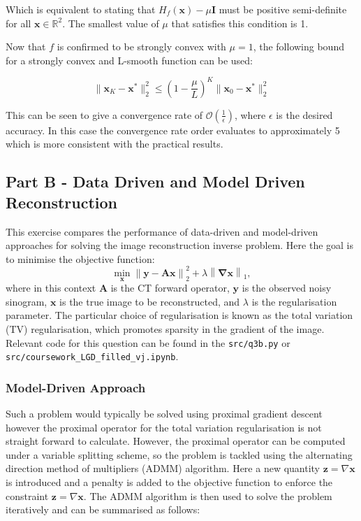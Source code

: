 \documentclass[11pt]{article}
\begin{document}
Which is equivalent to stating that \( H_f(\mathbf{x}) - \mu \mathbf{I} \) must be positive semi-definite for all \( \mathbf{x} \in \mathbb{R}^2 \). The smallest value of \( \mu \) that satisfies this condition is 1.

Now that \( f \) is confirmed to be strongly convex with \( \mu = 1 \), the following bound for a strongly convex and L-smooth function can be used:

\[
\|\mathbf{x}_K - \mathbf{x}^*\|_2^2 \leq \left(1 - \frac{\mu}{L}\right)^K \|\mathbf{x}_0 - \mathbf{x}^*\|_2^2
\]

This can be seen to give a convergence rate of $\mathcal{O}\left(\frac{1}{\epsilon}\right)$, where $\epsilon$ is the desired accuracy. In this case the convergence rate order evaluates to approximately 5 which is more consistent with the practical results.

\subsection{Part B - Data Driven and Model Driven Reconstruction}
This exercise compares the performance of data-driven and model-driven approaches for solving the image reconstruction inverse problem. Here the goal is to minimise the objective function:
\[
\min_{\mathbf{x}} \left\| \mathbf{y} - \mathbf{A} \mathbf{x} \right\|_2^2 + \lambda \left\| \mathbf \nabla \mathbf{x} \right\|_1,
\]
where in this context \( \mathbf{A} \) is the CT forward operator, \( \mathbf{y} \) is the observed noisy sinogram, \( \mathbf{x} \) is the true image to be reconstructed, and \( \lambda \) is the regularisation parameter. The particular choice of regularisation is known as the total variation (TV) regularisation, which promotes sparsity in the gradient of the image.
Relevant code for this question can be found in the \texttt{src/q3b.py} or \texttt{src/coursework\_LGD\_filled\_vj.ipynb}.
\subsubsection{Model-Driven Approach}
Such a problem would typically be solved using proximal gradient descent however the proximal operator for the total variation regularisation is not straight forward to calculate. However, the proximal operator can be computed under a variable splitting scheme, so the problem is tackled using the alternating direction method of multipliers (ADMM) algorithm. Here a new quantity \( \mathbf{z} = \nabla \mathbf{x}\) is introduced and a penalty is added to the objective function to enforce the constraint \( \mathbf{z} = \nabla \mathbf{x} \). The ADMM algorithm is then used to solve the problem iteratively and can be summarised as follows:
\end{document}
